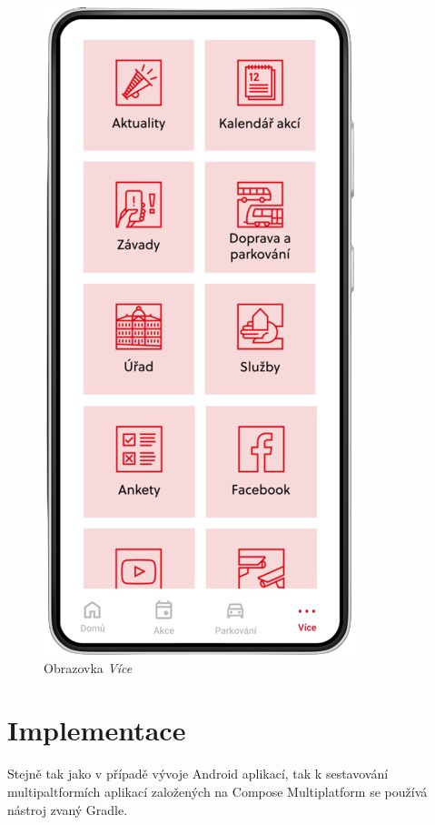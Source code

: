 \begin{figure}[H]
  \includegraphics[width=\linewidth]{screen4.png}
  \caption{Obrazovka \textit{Více}}
\endminipage\hfill
\end{figure}

\chapter{Implementace}
Stejně tak jako v případě vývoje Android aplikací, tak k sestavování multipaltformích aplikací založených na Compose Multiplatform 
se používá nástroj zvaný Gradle.  

